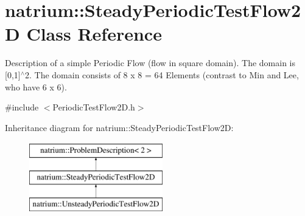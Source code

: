 \hypertarget{classnatrium_1_1SteadyPeriodicTestFlow2D}{\section{natrium\-:\-:Steady\-Periodic\-Test\-Flow2\-D Class Reference}
\label{classnatrium_1_1SteadyPeriodicTestFlow2D}
}


Description of a simple Periodic Flow (flow in square domain). The domain is \mbox{[}0,1\mbox{]}$^\wedge$2. The domain consists of 8 x 8 = 64 Elements (contrast to Min and Lee, who have 6 x 6).  




{\ttfamily \#include $<$Periodic\-Test\-Flow2\-D.\-h$>$}

Inheritance diagram for natrium\-:\-:Steady\-Periodic\-Test\-Flow2\-D\-:\begin{figure}[H]
\begin{center}
\leavevmode
\includegraphics[height=3.000000cm]{classnatrium_1_1SteadyPeriodicTestFlow2D}
\end{center}
\end{figure}
